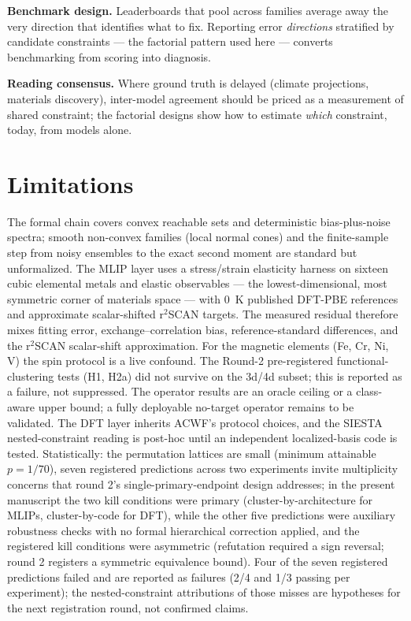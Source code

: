 \documentclass[11pt]{article}
\begin{document}
\textbf{Benchmark design.} Leaderboards that pool across families average away
the very direction that identifies what to fix. Reporting error
\emph{directions} stratified by candidate constraints --- the factorial
pattern used here --- converts benchmarking from scoring into diagnosis.

\textbf{Reading consensus.} Where ground truth is delayed (climate
projections, materials discovery), inter-model agreement should be priced as a
measurement of shared constraint; the factorial designs show how to estimate
\emph{which} constraint, today, from models alone.

\section{Limitations}
\label{sec:limits}

The formal chain covers convex reachable sets and deterministic
bias-plus-noise spectra; smooth non-convex families (local normal cones) and
the finite-sample step from noisy ensembles to the exact second moment are
standard but unformalized. The MLIP layer uses a stress/strain elasticity harness on sixteen cubic
elemental metals and elastic observables --- the lowest-dimensional, most
symmetric corner of materials space --- with 0~K published DFT-PBE references
and approximate scalar-shifted r$^2$SCAN targets. The measured residual
therefore mixes fitting error, exchange--correlation bias, reference-standard
differences, and the r$^2$SCAN scalar-shift approximation. For the magnetic
elements (Fe, Cr, Ni, V) the spin protocol is a live confound. The Round-2
pre-registered functional-clustering tests (H1, H2a) did not survive on the
3d/4d subset; this is reported as a failure, not suppressed. The operator
results are an oracle ceiling or a class-aware upper bound; a fully deployable
no-target operator remains to be validated.
The DFT layer inherits ACWF's protocol choices, and the SIESTA nested-constraint
reading is post-hoc until an independent localized-basis code is tested.
Statistically: the permutation lattices are small (minimum attainable $p = 1/70$),
seven registered predictions across two experiments invite multiplicity concerns
that round 2's single-primary-endpoint design addresses; in the present
manuscript the two kill conditions were primary (cluster-by-architecture for
MLIPs, cluster-by-code for DFT), while the other five predictions were
auxiliary robustness checks with no formal hierarchical correction applied, and
the registered kill conditions were asymmetric (refutation required a sign
reversal; round 2 registers a symmetric equivalence bound). Four of the seven
registered predictions failed and are reported as failures (2/4 and 1/3
passing per experiment); the nested-constraint attributions of those misses
are hypotheses for the next registration round, not confirmed claims.
\end{document}
